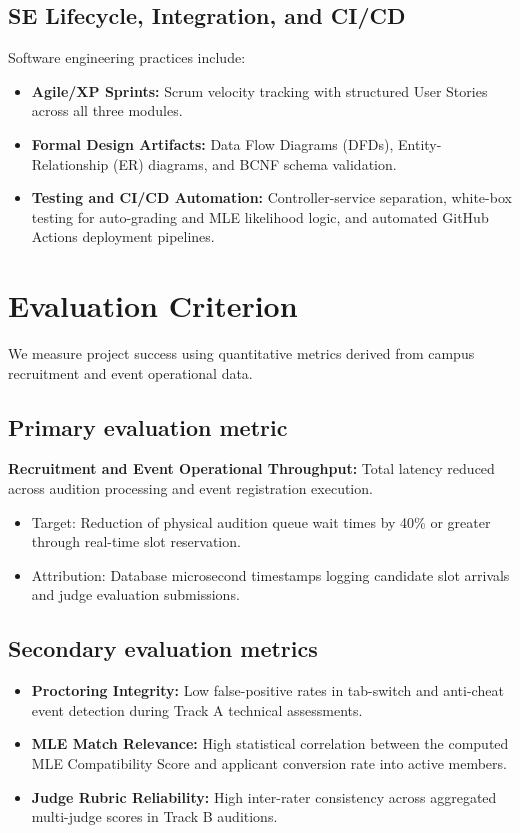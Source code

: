 \documentclass[11pt,a4paper]{article}
\begin{document}
\subsection{SE Lifecycle, Integration, and CI/CD}
Software engineering practices include:
\begin{itemize}[leftmargin=0.7cm]
    \item \textbf{Agile/XP Sprints:} Scrum velocity tracking with structured User Stories across all three modules.
    \item \textbf{Formal Design Artifacts:} Data Flow Diagrams (DFDs), Entity-Relationship (ER) diagrams, and BCNF schema validation.
    \item \textbf{Testing and CI/CD Automation:} Controller-service separation, white-box testing for auto-grading and MLE likelihood logic, and automated GitHub Actions deployment pipelines.
\end{itemize}

\section{Evaluation Criterion}
We measure project success using quantitative metrics derived from campus recruitment and event operational data.

\subsection{Primary evaluation metric}
\textbf{Recruitment and Event Operational Throughput:} Total latency reduced across audition processing and event registration execution.
\begin{itemize}[leftmargin=0.7cm]
    \item Target: Reduction of physical audition queue wait times by 40\% or greater through real-time slot reservation.
    \item Attribution: Database microsecond timestamps logging candidate slot arrivals and judge evaluation submissions.
\end{itemize}

\subsection{Secondary evaluation metrics}
\begin{itemize}[leftmargin=0.7cm]
    \item \textbf{Proctoring Integrity:} Low false-positive rates in tab-switch and anti-cheat event detection during Track A technical assessments.
    \item \textbf{MLE Match Relevance:} High statistical correlation between the computed MLE Compatibility Score and applicant conversion rate into active members.
    \item \textbf{Judge Rubric Reliability:} High inter-rater consistency across aggregated multi-judge scores in Track B auditions.
\end{itemize}
\end{document}
